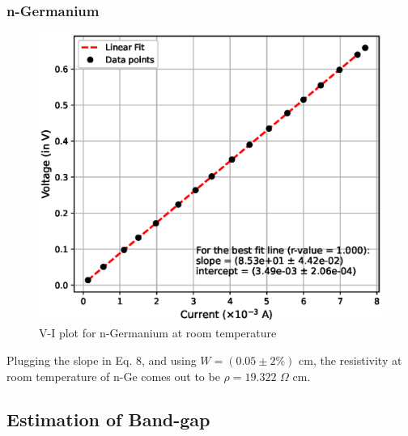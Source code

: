\subsubsection{n-Germanium}
\vspace{-2em}
\begin{figure}[H]   
    \centering
    \includegraphics[width=1\columnwidth]{images/ge.eps}
    \caption{V-I plot for n-Germanium at room temperature}
    \label{3}
\end{figure}
Plugging the slope in Eq. 8, and using $W=(0.05 \pm 2\%)$ cm, the resistivity at room temperature of n-Ge comes out to be $\rho = 19.322\,\,\Omega$ cm.

\subsection{Estimation of Band-gap}
